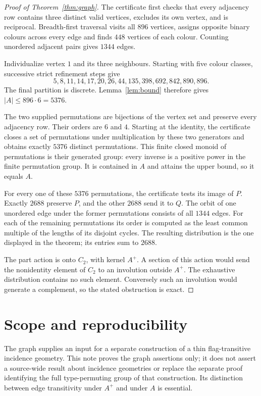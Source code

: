 \documentclass[11pt,a4paper]{article}
\begin{document}
\begin{proof}[Proof of Theorem~\ref{thm:graph}]
The certificate first checks that every adjacency row contains three
distinct valid vertices, excludes its own vertex, and is reciprocal.
Breadth-first traversal visits all $896$ vertices, assigns opposite binary
colours across every edge and finds $448$ vertices of each colour.  Counting
unordered adjacent pairs gives $1344$ edges.

Individualize vertex $1$ and its three neighbours.  Starting with five
colour classes, successive strict refinement steps give
\[
5,8,11,14,17,20,26,44,135,398,692,842,890,896.
\]
The final partition is discrete.  Lemma~\ref{lem:bound} therefore gives
$|A|\leq896\cdot6=5376$.

The two supplied permutations are bijections of the vertex set and preserve
every adjacency row.  Their orders are $6$ and $4$.  Starting at the identity,
the certificate closes a set of permutations under multiplication by these
two generators and obtains exactly $5376$ distinct permutations.  This
finite closed monoid of permutations is their generated group: every inverse
is a positive power in the finite permutation group.  It is contained in
$A$ and attains the upper bound, so it equals $A$.

For every one of these $5376$ permutations, the certificate tests its image
of $P$.  Exactly $2688$ preserve $P$, and the other $2688$ send it to $Q$.
The orbit of one unordered edge under the former permutations consists of
all $1344$ edges.  For each of the remaining permutations its order is
computed as the least common multiple of the lengths of its disjoint cycles.
The resulting distribution is the one displayed in the theorem; its entries
sum to $2688$.

The part action is onto $C_2$, with kernel $A^+$.  A section of this action
would send the nonidentity element of $C_2$ to an involution outside $A^+$.
The exhaustive distribution contains no such element.  Conversely such an
involution would generate a complement, so the stated obstruction is exact.
\end{proof}

\newpage
\section{Scope and reproducibility}
The graph supplies an input for a separate construction of a thin
flag-transitive incidence geometry.  This note proves the graph assertions
only; it does not assert a source-wide result about incidence geometries or
replace the separate proof identifying the full type-permuting group of
that construction.  Its distinction between edge transitivity under $A^+$
and under $A$ is essential.
\end{document}
